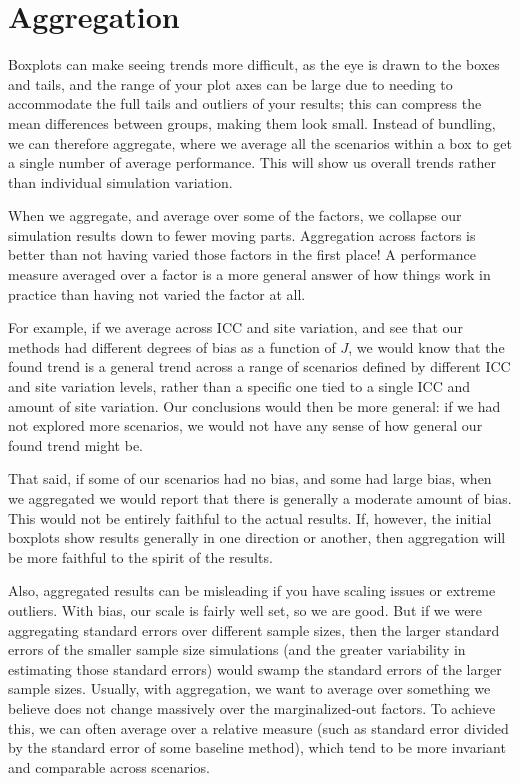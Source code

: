 \documentclass[
]{book}
\begin{document}
\section{Aggregation}\label{aggregation}

Boxplots can make seeing trends more difficult, as the eye is drawn to the boxes and tails, and the range of your plot axes can be large due to needing to accommodate the full tails and outliers of your results; this can compress the mean differences between groups, making them look small.
Instead of bundling, we can therefore aggregate, where we average all the scenarios within a box to get a single number of average performance.
This will show us overall trends rather than individual simulation variation.

When we aggregate, and average over some of the factors, we collapse our simulation results down to fewer moving parts.
Aggregation across factors is better than not having varied those factors in the first place!
A performance measure averaged over a factor is a more general answer of how things work in practice than having not varied the factor at all.

For example, if we average across ICC and site variation, and see that our methods had different degrees of bias as a function of \(J\), we would know that the found trend is a general trend across a range of scenarios defined by different ICC and site variation levels, rather than a specific one tied to a single ICC and amount of site variation.
Our conclusions would then be more general: if we had not explored more scenarios, we would not have any sense of how general our found trend might be.

That said, if some of our scenarios had no bias, and some had large bias, when we aggregated we would report that there is generally a moderate amount of bias.
This would not be entirely faithful to the actual results.
If, however, the initial boxplots show results generally in one direction or another, then aggregation will be more faithful to the spirit of the results.

Also, aggregated results can be misleading if you have scaling issues or extreme outliers.
With bias, our scale is fairly well set, so we are good.
But if we were aggregating standard errors over different sample sizes, then the larger standard errors of the smaller sample size simulations (and the greater variability in estimating those standard errors) would swamp the standard errors of the larger sample sizes.
Usually, with aggregation, we want to average over something we believe does not change massively over the marginalized-out factors.
To achieve this, we can often average over a relative measure (such as standard error divided by the standard error of some baseline method), which tend to be more invariant and comparable across scenarios.
\end{document}
